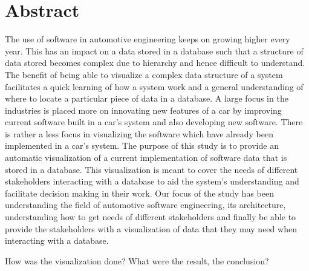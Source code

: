 \thispagestyle{plain}			%
\setlength{\parskip}{0pt plus 1.0pt}

\section*{Abstract}
The use of software in automotive engineering keeps on growing higher every year. This has an impact on a data stored in a database such that a structure of data stored becomes complex due to hierarchy and hence difficult to understand. 
The benefit of being able to visualize a complex data structure of a system facilitates a quick learning of how a system work and a general understanding of where to locate a particular piece of data in a database. 
A large focus in the industries is placed more on innovating new features of a car by improving current software built in a car’s system and also developing new software. There is rather a less focus in visualizing the software which have already been implemented in a car’s system.
The purpose of this study is to provide an automatic visualization of a current implementation of software data that is stored in a database. This visualization is meant to cover the needs of different stakeholders interacting with a database to aid the system’s understanding and facilitate decision making in their work.
Our focus of the study has been understanding the field of automotive software engineering, its architecture, understanding how to get needs of different stakeholders and finally be able to provide the stakeholders with a visualization of data that they may need when interacting with a database.

How was the visualization done?
What were the result, the conclusion?
\todo{[to be filled in]}


\thispagestyle{empty}
\mbox{}